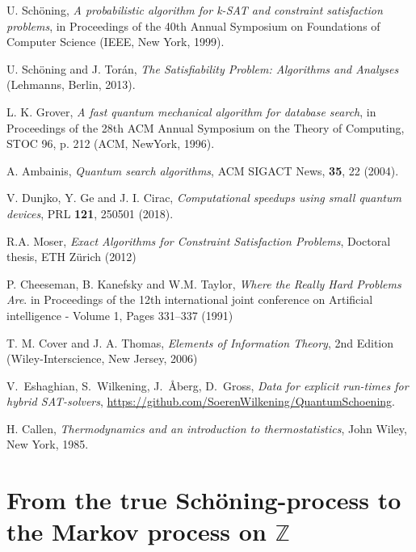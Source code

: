 \documentclass[a4paper,aps,floatfix]{revtex4}
\begin{document}
\begin{thebibliography}{99}
 U. Sch\"oning, \emph{A probabilistic algorithm for k-SAT and constraint satisfaction problems}, in Proceedings of the 40th Annual Symposium on Foundations of Computer Science (IEEE, New York, 1999).

 U. Sch\"oning and J. Tor\'an, \emph{The Satisfiability Problem: Algorithms and Analyses} (Lehmanns, Berlin, 2013).

 L. K. Grover, \emph{A fast quantum mechanical algorithm for database search}, in Proceedings of the 28th ACM Annual Symposium on the Theory of Computing, STOC 96, p. 212 (ACM, NewYork, 1996).

  A. Ambainis, \emph{Quantum search algorithms}, ACM SIGACT News, {\bf 35}, 22 (2004).

 V. Dunjko, Y. Ge and J. I. Cirac, \emph{Computational speedups using small quantum devices}, PRL {\bf 121}, 250501 (2018).

 R.A. Moser, \emph{Exact Algorithms for Constraint Satisfaction Problems}, Doctoral thesis, ETH Zürich (2012)

 P. Cheeseman, B.  Kanefsky and W.M. Taylor, \emph{Where the Really Hard Problems Are}. in Proceedings of the 12th international joint conference on Artificial intelligence - Volume 1, Pages 331–337 (1991)

 T. M. Cover and J. A. Thomas, \emph{Elements of Information Theory}, 2nd Edition (Wiley-Interscience, New Jersey, 2006) 

V.\ Eshaghian,
S.\ Wilkening, 
J.\ {\AA}berg, 
D.\ Gross,
\emph{Data for explicit run-times for hybrid SAT-solvers}, \url{https://github.com/SoerenWilkening/QuantumSchoening}.

 H. Callen, \emph{Thermodynamics and an introduction to thermostatistics}, John Wiley, New York, 1985.

\end{thebibliography}


\newpage
\appendix

\section{\label{AppFromSchToZ}From the true Sch\"oning-process  to the Markov process on $\mathbb{Z}$}
\end{document}
